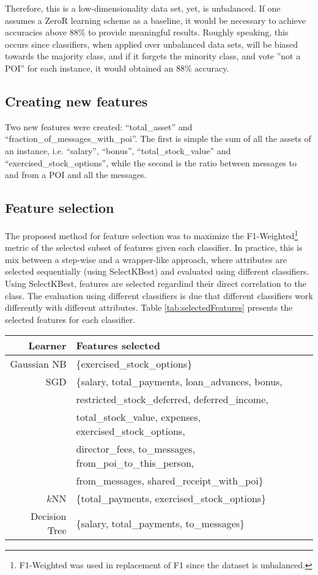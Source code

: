 \documentclass[11pt]{article}
\begin{document}
		Therefore, this is a low-dimensionality data set, yet, is unbalanced.
		If one assumes a ZeroR learning scheme as a baseline, it would be necessary to achieve accuracies above 88\% to provide meaningful results.
		Roughly speaking, this occurs since classifiers, when applied over unbalanced data sets, will be biased towards the majority class, and if it forgets the minority class, and vote ''not a POI'' for each instance, it would obtained an 88\% accuracy.
	
	
	\subsection{Creating new features}
		Two new features were created: ``total\_asset'' and ``fraction\_of\_messages\_with\_poi''.
		The first is simple the sum of all the assets of an instance, i.e. ``salary'', ``bonus'', ``total\_stock\_value'' and ``exercised\_stock\_options'', while the second is the ratio between messages to and from a POI and all the messages.
	
	
	\subsection{Feature selection}
		The proposed method for feature selection was to maximize the F1-Weighted\footnote{F1-Weighted was used in replacement of F1 since the dataset is unbalanced.} metric of the selected subset of features given each classifier.
		In practice, this is mix between a step-wise and a wrapper-like approach, where attributes are selected sequentially (using SelectKBest) and evaluated using different classifiers.
		Using SelectKBest, features are selected regardind their direct correlation to the class.
		The evaluation using different classifiers is due that different classifiers work differently with different attributes.
		Table \ref{tab:selectedFeatures} presents the selected features for each classifier.

		\begin{table*}[!t]
			\centering
			\caption{Features selected for usage in each classifier.}
			\begin{tabular}{rl}
				\hline
				Learner & Features selected\\
				\hline
				Gaussian NB & \{exercised\_stock\_options\}\\
				SGD & \{salary, total\_payments, loan\_advances, bonus,\\
				~   & restricted\_stock\_deferred, deferred\_income,\\ 
				~   & total\_stock\_value, expenses, exercised\_stock\_options, \\
				~   & director\_fees, to\_messages, from\_poi\_to\_this\_person, \\
				~   & from\_messages, shared\_receipt\_with\_poi\}\\
				$k$NN & \{total\_payments, exercised\_stock\_options\}\\
				Decision Tree & \{salary, total\_payments, to\_messages\}\\
				\hline
			\end{tabular}
			\label{tab:selectedFeatures}
		\end{table*}
			
\end{document}
